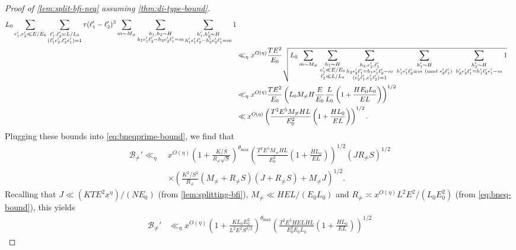 \documentclass[reqno,11pt]{amsart}
\theoremstyle{definition}
\theoremstyle{remark}
\numberwithin{equation}{section}
\newcommand{\mB}{\mathcal{B}}
\renewcommand{\pmod}[1]{\ (\textnormal{mod } #1)}
\begin{document}
\begin{proof}[Proof of \cref{lem:split-bfi-neq} assuming \cref{thm:di-type-bound}]
\[\begin{aligned}
{    L_0
    \sum_{e_1', e_2' \ll E/E_0}
    \sum_{\substack{\ell_1', \ell_2' \asymp L/L_0 \\ (\ell_1'e_2', \ell_2'e_1') = 1}}
    \tau(\ell_1' - \ell_2')^3
    \sum_{m \sim M_{\neq}}
    \sum_{\substack{h_1, h_2 \sim H \\ h_1 e_1' \ell_2' - h_2 e_2' \ell_1' = m}} 
    \sum_{\substack{h_1', h_2' \sim H \\ h_1' e_1' \ell_2' - h_2' e_2' \ell_1' = m}} 1
    }
    \\
    &\ll_\eta
    x^{O(\eta)} \frac{TE^2}{E_0} \sqrt{L_0
    \sum_{m \sim M_{\neq}}\,
    \sum_{\substack{h_1 \sim H \\ e_1' \ll E/E_0 \\ \ell_2' \ll L/L_0 }}
    \sum_{\substack{h_2, e_2', \ell_1' \\ h_2e_2'\ell_1' = h_1 e_1' \ell_2' - m \\ (e_2'\ell_1', e_1'\ell_2') = 1}}
    \ \sum_{\substack{h_1' \sim H \\ h_1'e_1'\ell_2' \equiv m \pmod{e_2'\ell_1'}}} 
    \ \sum_{\substack{h_2' \sim H \\ h_2'e_2'\ell_1' = h_1'\ell_2'e_1' - m}} 1
    }
    \\
    &\ll_\eta 
    x^{O(\eta)} \frac{TE^2}{E_0} \left(L_0 M_{\neq} H \frac{E}{E_0} \frac{L}{L_0} \left(1 + \frac{HE_0L_0}{EL}\right)\right)^{1/2}
    \\
    &\ll 
    x^{O(\eta)} \left(\frac{T^2 E^5 M_{\neq} H L}{E_0^2} \left(1 + \frac{H L_0}{EL}\right)\right)^{1/2}.
\end{aligned}
\]
Plugging these bounds into \cref{eq:bneqprime-bound}, we find that
\[
\begin{aligned}
    \mB_{\neq}' \ll_\eta\ &x^{O(\eta)}
    \left(1 + \frac{K/S}{R_{\neq} \sqrt{S}}\right)^{\theta_{\max}}
    \left(\frac{T^2 E^5 M_{\neq} H L}{E_0^2} \left(1 + \frac{H L_0}{EL}\right)\right)^{1/2} \left(J R_{\neq} S\right)^{1/2}
    \\
    &\times 
    \left(\frac{K^2/S^2}{R_{\neq}} \left(M_{\neq} + R_{\neq} S\right)\left(J + R_{\neq} S\right) + M_{\neq}J \right)^{1/2}.
\end{aligned}
\]
Recalling that $J \ll (K T E^2 x^\eta)/(NE_0)$ (from \cref{lem:splitting-bfi}), $M_{\neq} \ll HEL/(E_0 L_0)$ and $R_{\neq} \asymp x^{O(\eta)} L^2 E^2 / (L_0 E_0^2)$ (from \cref{eq:bneq-bound}), this yields
\[
\begin{aligned}
    \mB_{\neq}' &\ll_\eta x^{O(\eta)} \left(1 + \frac{K L_0 E_0^2}{L^2 E^2 S^{3/2}}\right)^{\theta_{\max}}
    \left(\frac{T^2 E^5 HEL H L}{E_0^2 E_0 L_0} \left(1 + \frac{H L_0}{EL}\right)\right)^{1/2} 

\end{aligned}\]
\end{proof}
\end{document}
